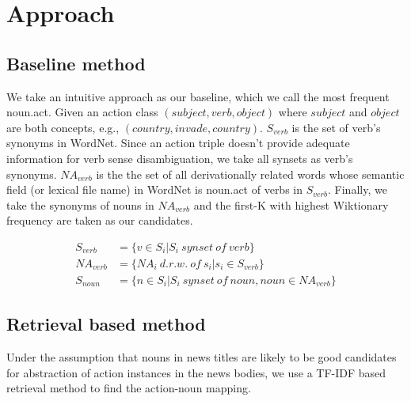 \section{Approach}

\subsection{Baseline method}
We take an intuitive approach as our baseline, which we call the most frequent noun.act.
Given an action class $(subject, verb, object)$ where $subject$ and $object$ are both concepts, e.g., $(country, invade, country)$.
 $S_{verb}$ is the set of verb's synonyms in WordNet. Since an action triple doesn't provide adequate information for verb sense disambiguation,
we take all synsets as verb's synonyms. $NA_{verb}$ is the the set of all derivationally related words whose semantic field
(or lexical file name) in WordNet is noun.act of verbs in $S_{verb}$.
Finally, we take the synonyms of nouns in $NA_{verb}$ and the first-K with highest Wiktionary frequency are taken as our candidates.

\begin{align}
    S_{verb} & = \{{ v \in S_i | S_i \ synset \ of \ verb}\} \\
    NA_{verb} & = \{{ NA_i \ d.r.w.  \ of \ s_i | s_i \in S_{verb}}\} \\
    S_{noun} & = \{{ n \in S_i | S_i \ synset \ of \ noun, noun \in NA_{verb}}\}
\end{align}

\subsection{Retrieval based method}

Under the assumption that nouns in news titles are likely to be good candidates
for abstraction of action instances in the news bodies, we use a TF-IDF based retrieval method
to find the action-noun mapping.

